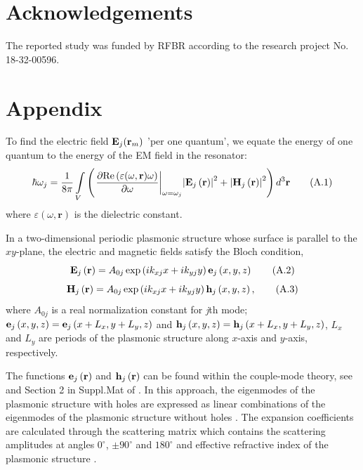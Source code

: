 \documentclass[aps,prapplied,amsmath,amssymb,onecolumn,superscriptaddress,showpacs,floatfix,longbibliography]{revtex4-1}
\begin{document}
\section*{Acknowledgements}

The reported study was funded by RFBR according to the research project No. 18-32-00596.

\section*{Appendix}
To find the electric field ${{\bf{E}}_j}({{\bf{r}}_m})$  'per one quantum', we equate the energy of one quantum to the energy of the EM field in the resonator:
\begin{equation}
\hbar {\omega _j} = \frac{1}{{8\pi }}\int\limits_V {\left( {{{\left. {\frac{{\partial {\mathop{\rm Re}\nolimits} \left( {\varepsilon(\omega, \textbf{r}) \omega } \right)}}{{\partial \omega }}} \right|}_{\omega  = {\omega _j}}}{{\left| {{{\bf{E}}_j}\left( {\bf{r}} \right)} \right|}^2} + {{\left| {{{\bf{H}}_j}\left( {\bf{r}} \right)} \right|}^2}} \right){d^3}{\bf{r}}} \tag{A.1}
\end{equation}
where $\varepsilon (\omega, \textbf{r})$  is the dielectric constant.

In a two-dimensional periodic plasmonic structure whose surface is parallel to the $xy$-plane, the electric and magnetic fields satisfy the Bloch condition,
\begin{equation}
{{\bf{E}}_j}\left( {\bf{r}} \right) = {A_{0j}}\exp \left( {i{k_{xj}}x + i{k_{yj}}y} \right){{\bf{e}}_j}\left( {x,y,z} \right) \tag{A.2}
\end{equation}
\begin{equation}
{{\bf{H}}_j}\left( {\bf{r}} \right) = {A_{0j}}\exp \left( {i{k_{xj}}x + i{k_{yj}}y} \right){{\bf{h}}_j}\left( {x,y,z} \right), \tag{A.3}
\end{equation}
where $A_{0j}$ is a real normalization constant for \textit{j}th mode; ${{\bf{e}}_j}\left( {x,y,z} \right) = {{\bf{e}}_j}\left( {x + {L_x},y + {L_y},z} \right)$  and ${{\bf{h}}_j}\left( {x,y,z} \right) = {{\bf{h}}_j}\left( {x + {L_x},y + {L_y},z} \right)$, $L_x$ and $L_y$ are periods of the plasmonic structure along $x$-axis and $y$-axis, respectively.

The functions ${{\bf{e}}_j}\left(\textbf{r}\right)$ and ${{\bf{h}}_j}\left(\textbf{r}\right)$ can be found within the couple-mode theory, see \cite{TennerJOpt,TennerACSPhot} and Section 2 in Suppl.Mat of \cite{nefedkin2018acsphot}. In this approach, the eigenmodes of the plasmonic structure with holes are expressed as linear combinations of the eigenmodes of the plasmonic structure without holes \cite{TennerJOpt,TennerACSPhot}. The expansion coefficients are calculated through the scattering matrix which contains the scattering amplitudes at angles $0^{\circ }$, $\pm 90^{\circ }$ and $180^{\circ }$ and effective refractive index of the plasmonic structure \cite{TennerJOpt,TennerACSPhot}.
\end{document}
